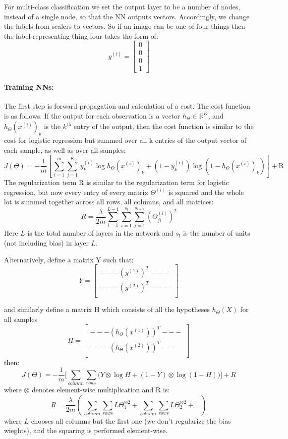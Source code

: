 \documentclass[12pt]{article}
\begin{document}
For multi-class classification we set the output layer to be a number of nodes, instead of a single node, so that the NN outputs vectors. Accordingly, we change the labels from scalers to vectors. So if an image can be one of four things then the label representing thing four takes the form of:
\[
y^{(i)} = 
\begin{bmatrix}
0\\0\\0\\1
\end{bmatrix}
\]

\paragraph{Training NNs:}
The first step is forward propagation and calculation of a cost. The cost function is as follows. If  the output for each observation is a vector $h_\Theta \in \mathbb{R}^K$, and $h_\Theta(x^{(i)})_k$ is the $k^\text{th}$ entry of the output, then the cost function is similar to the cost for logistic regression but summed over all k entries of the output vector of each sample, as well as over all samples:
\[
J(\Theta) = -\frac{1}{m} \left[ \, \sum_{i=1}^m	 \sum_{j=1}^K  \,
	y_k^{(i)} \log h_\Theta (x^{(i)})_k +
	(1 - y_k^{(i)}) \log \left( 1 - h_\Theta (x^{(i)})_k \right)
	\right] + \text{R}
\]
The regularization term R is similar to the regularization term for logistic regression, but now every entry of every matrix $\Theta^{(l)}$ is squared and the whole lot is summed together across all rows, all columns, and all matrices:
\[
R = \frac{\lambda}{2m} \sum_{l=1}^{L-1} \sum_{i=1}^{s_l} \sum_{j=1}^{s_{l+1}} (\Theta_{ji}^{(l)} )^2
\]
Here $L$ is the total number of layers in the network and $s_l$ is the number of units (not including bias) in layer $L$. 

Alternatively, define a matrix Y such that:
\[
Y = 
\begin{bmatrix}
{ --- \left( y^{(1)} \right)^T --- }\\[0.5em]
{ --- \left( y^{(2)} \right)^T --- }\\
\end{bmatrix}
\]

and similarly define a matrix H which consists of all the hypotheses $h_\Theta(X)$ for all samples
\[
H = 
\begin{bmatrix}
{ --- \left( h_\Theta (x^{(1)}) \right)^T --- }\\[0.5em]
{ --- \left( h_\Theta (x^{(2)}) \right)^T --- }\\
\end{bmatrix}
\]
then:
\[
J(\Theta) = 
-\frac{1}{m}\Big[ \sum_{column} \sum_{rows} \big( Y \otimes \log H + (1-Y) \otimes \log(1-H) \big) \Big] + R
\]
where $\otimes$ denotes element-wise multiplication and R is:
\[
R  = \frac{\lambda}{2m} \left( \, \sum_{column} \sum_{rows} L \Theta_1^{\otimes2}  + \sum_{column} \sum_{rows} L \Theta_2^{\otimes2}  + \dots \right)
\]
where $L$ chooses all columns but the first one (we don't regularize the bias wieghts), and the squaring is performed element-wise. 
\end{document}
